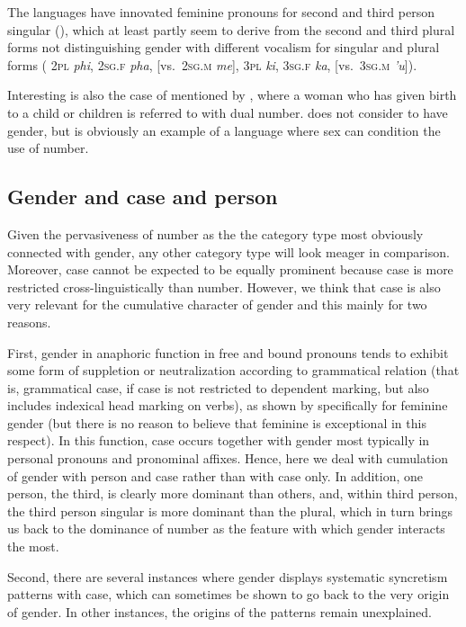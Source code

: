 \documentclass[output=collectionpaper]{langsci/langscibook}
\begin{document}
\largerpage
The  languages have innovated feminine pronouns for second and third person singular (\citealt[184]{Daladier2011}), which at least partly seem to derive from the second and third plural forms not distinguishing gender with different vocalism for singular and plural forms ( \textsc{2pl} \textit{phi}, \textsc{2sg.f} \textit{pha}, [vs.\ \textsc{2sg.m} \textit{me}], \textsc{3pl} \textit{ki}, \textsc{3sg.f} \textit{ka}, [vs.\ \textsc{3sg.m} \textit{'u}]).

Interesting is also the case of  mentioned by , where a woman who has given birth to a child or children is referred to with dual number. \cite[42]{Payne1985} does not consider  to have gender, but  is obviously an example of a language where sex can condition the use of number.

  \subsection{Gender and case and person}
\label{sec:WDG:8.2}

Given the pervasiveness of number as the the category type most obviously connected with gender, any other category type will look meager in comparison. Moreover, case cannot be expected to be equally prominent because case is more restricted cross-linguistically than number. However, we think that case is also very relevant for the cumulative character of gender and this mainly for two reasons.

First, gender in anaphoric function in free and bound pronouns tends to exhibit some form of suppletion or neutralization according to grammatical relation (that is, grammatical case, if case is not restricted to dependent marking, but also includes indexical head marking on verbs), as shown by  specifically for feminine gender (but there is no reason to believe that feminine is exceptional in this respect). In this function, case occurs together with gender most typically in personal pronouns and pronominal affixes. Hence, here we deal with cumulation of gender with person and case rather than with case only. In addition, one person, the third, is clearly more dominant than others, and, within third person, the third person singular is more dominant than the plural, which in turn brings us back to the dominance of number as the feature with which gender interacts the most.

Second, there are several instances where gender displays systematic syncretism patterns with case, which can sometimes be shown to go back to the very origin of gender. In other instances, the origins of the patterns remain unexplained.
\end{document}
